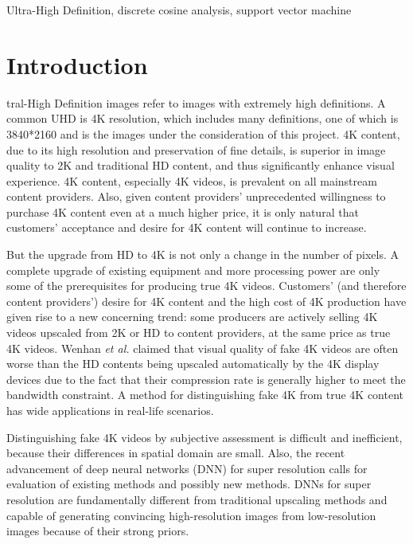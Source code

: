 \documentclass[journal,conference]{IEEEtran}
\begin{document}
\begin{IEEEkeywords}
Ultra-High Definition, discrete cosine analysis, support vector machine
\end{IEEEkeywords}


\IEEEpeerreviewmaketitle



\section{Introduction}
tral-High Definition images refer to images with extremely high definitions.
A common UHD is 4K resolution, which includes many definitions, one of which is 3840*2160 and is the images under the consideration of this project. 4K content, due to its high resolution and preservation of fine details, is superior in image quality to 2K and traditional HD content, and thus significantly enhance visual experience. 4K content, especially 4K videos, is prevalent on all mainstream content providers. Also, given content providers' unprecedented willingness to purchase 4K content even at a much higher price, it is only natural that customers' acceptance and desire for 4K content will continue to increase.

But the upgrade from HD to 4K is not only a change in the number of pixels. A complete upgrade of existing equipment and more processing power are only some of the prerequisites for producing true 4K videos. Customers' (and therefore content providers') desire for 4K content and the high cost of 4K production have given rise to a new concerning trend: some producers are actively selling 4K videos upscaled from 2K or HD to content providers, at the same price as true 4K videos. Wenhan \textit{et al.} \cite{zhu2016distinguish} claimed that visual quality of fake 4K videos are often worse than the HD contents being upscaled automatically by the 4K display devices due to the fact that their compression rate is generally higher to meet the bandwidth constraint. A method for distinguishing fake 4K from true 4K content has wide applications in real-life scenarios.

Distinguishing fake 4K videos by subjective assessment is difficult and inefficient, because their differences in spatial domain are small. Also, the recent advancement of deep neural networks (DNN) for super resolution calls for evaluation of existing methods and possibly new methods. DNNs for super resolution are fundamentally different from traditional upscaling methods and capable of generating convincing high-resolution images from low-resolution images because of their strong priors.
\end{document}
